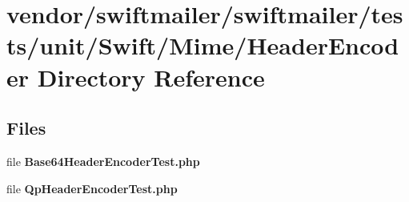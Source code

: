 \section{vendor/swiftmailer/swiftmailer/tests/unit/\+Swift/\+Mime/\+Header\+Encoder Directory Reference}
\label{dir_45bc3cd9be64a85a50393546b5db1dbd}
\subsection*{Files}
\begin{DoxyCompactItemize}
\item 
file {\bf Base64\+Header\+Encoder\+Test.\+php}
\item 
file {\bf Qp\+Header\+Encoder\+Test.\+php}
\end{DoxyCompactItemize}
